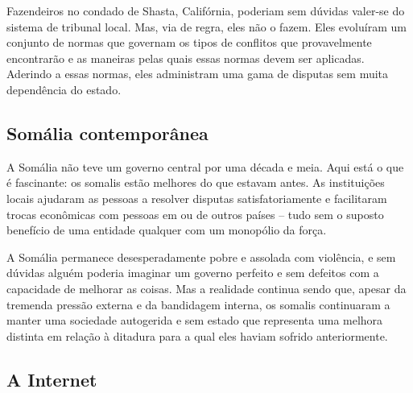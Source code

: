 Fazendeiros no condado de Shasta, Califórnia, poderiam sem dúvidas valer-se do sistema de tribunal local. Mas, via de regra, eles não o fazem. Eles evoluíram um conjunto de normas que governam os tipos de conflitos que provavelmente encontrarão e as maneiras pelas quais essas normas devem ser aplicadas. Aderindo a essas normas, eles administram uma gama de disputas sem muita dependência do estado.

\subsection*{Somália contemporânea}

A Somália não teve um governo central por uma década e meia. Aqui está o que é fascinante: os somalis estão melhores do que estavam antes. As instituições locais ajudaram as pessoas a resolver disputas satisfatoriamente e facilitaram trocas econômicas com pessoas em ou de outros países -- tudo sem o suposto benefício de uma entidade qualquer com um monopólio da força.

A Somália permanece desesperadamente pobre e assolada com violência, e sem dúvidas alguém poderia imaginar um governo perfeito e sem defeitos com a capacidade de melhorar as coisas. Mas a realidade continua sendo que, apesar da tremenda pressão externa e da bandidagem interna, os somalis continuaram a manter uma sociedade autogerida e sem estado que representa uma melhora distinta em relação à ditadura para a qual eles haviam sofrido anteriormente.

\subsection*{A Internet}

